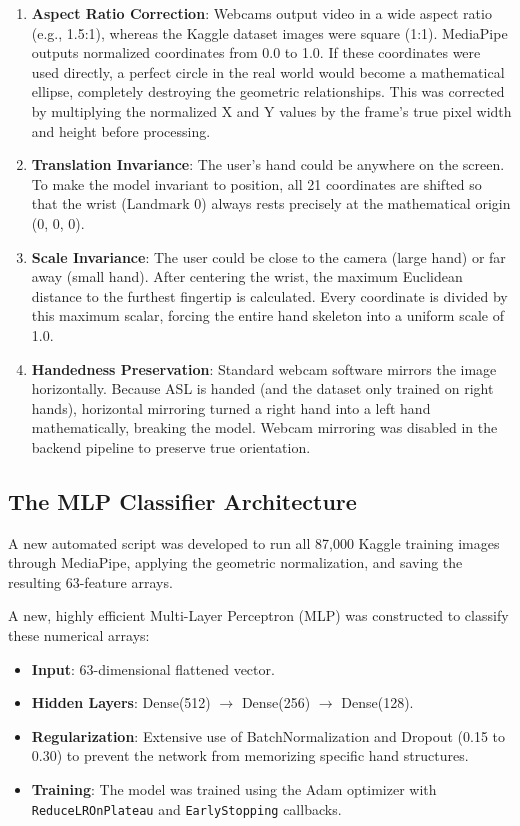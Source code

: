 \documentclass[12pt,a4paper]{article}
\begin{document}
\begin{enumerate}
    \item \textbf{Aspect Ratio Correction}: Webcams output video in a wide aspect ratio (e.g., 1.5:1), whereas the Kaggle dataset images were square (1:1). MediaPipe outputs normalized coordinates from 0.0 to 1.0. If these coordinates were used directly, a perfect circle in the real world would become a mathematical ellipse, completely destroying the geometric relationships. This was corrected by multiplying the normalized X and Y values by the frame's true pixel width and height before processing.
    \item \textbf{Translation Invariance}: The user's hand could be anywhere on the screen. To make the model invariant to position, all 21 coordinates are shifted so that the wrist (Landmark 0) always rests precisely at the mathematical origin (0, 0, 0).
    \item \textbf{Scale Invariance}: The user could be close to the camera (large hand) or far away (small hand). After centering the wrist, the maximum Euclidean distance to the furthest fingertip is calculated. Every coordinate is divided by this maximum scalar, forcing the entire hand skeleton into a uniform scale of 1.0.
    \item \textbf{Handedness Preservation}: Standard webcam software mirrors the image horizontally. Because ASL is handed (and the dataset only trained on right hands), horizontal mirroring turned a right hand into a left hand mathematically, breaking the model. Webcam mirroring was disabled in the backend pipeline to preserve true orientation.
\end{enumerate}

\subsection{The MLP Classifier Architecture}
A new automated script was developed to run all 87,000 Kaggle training images through MediaPipe, applying the geometric normalization, and saving the resulting 63-feature arrays. 

A new, highly efficient Multi-Layer Perceptron (MLP) was constructed to classify these numerical arrays:
\begin{itemize}
    \item \textbf{Input}: 63-dimensional flattened vector.
    \item \textbf{Hidden Layers}: Dense(512) $\rightarrow$ Dense(256) $\rightarrow$ Dense(128).
    \item \textbf{Regularization}: Extensive use of BatchNormalization and Dropout (0.15 to 0.30) to prevent the network from memorizing specific hand structures.
    \item \textbf{Training}: The model was trained using the Adam optimizer with \texttt{ReduceLROnPlateau} and \texttt{EarlyStopping} callbacks.
\end{itemize}
\end{document}
